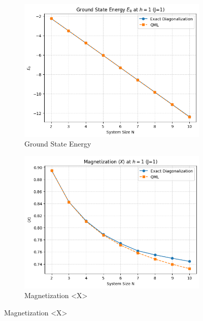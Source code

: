 \documentclass[pre,twocolumn,floatfix]{revtex4-1}
\begin{document}
\begin{figure}[htbp]
    \centering
    \begin{subfigure}[b]{0.32\textwidth} %
        \centering
        \includegraphics[width=\linewidth]{images/cmp_E.png} %
        \caption{Ground State Energy}
        \label{(a)}
    \end{subfigure}
    \hfill %
    \begin{subfigure}[b]{0.32\textwidth}
        \centering
        \includegraphics[width=\linewidth]{images/cmp_X.png} %
        \caption{Magnetization <X>}

\end{subfigure}
\end{figure}
\end{document}
